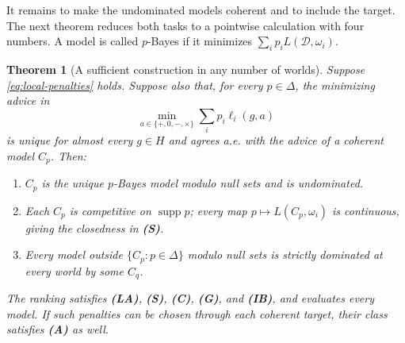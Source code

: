 \documentclass[11pt]{article}
\newtheorem{theorem}{Theorem}
\theoremstyle{remark}
\newcommand{\Dscr}{\mathcal D}
\newcommand{\supp}{\operatorname{supp}}
\begin{document}
It remains to make the undominated models coherent and to include the target.
The next theorem reduces both tasks to a pointwise calculation with four
numbers. A model is called $p$-Bayes if it minimizes
$\sum_i p_iL(\Dscr,\omega_i)$.

\begin{theorem}[A sufficient construction in any number of worlds]\label{thm:general}
Suppose \eqref{eq:local-penalties} holds. Suppose also that, for every
$p\in\Delta$, the minimizing advice in
\begin{equation}
 \min_{a\in\{+,0,-,\times\}}\sum_i p_i\ell_i(g,a)
 \label{eq:pointwise-bayes}
\end{equation}
is unique for almost every $g\in H$ and agrees a.e. with the advice of a
coherent model $C_p$. Then:
\begin{enumerate}[label=(\alph*)]
\item $C_p$ is the unique $p$-Bayes model modulo null sets and is undominated.
\item Each $C_p$ is competitive on $\supp p$; every map
$p\mapsto L(C_p,\omega_i)$ is continuous, giving the closedness in \textbf{(S)}.
\item Every model outside $\{C_p:p\in\Delta\}$ modulo null sets is strictly
dominated at every world by some $C_q$.
\end{enumerate}
The ranking satisfies \textbf{(LA)}, \textbf{(S)}, \textbf{(C)}, \textbf{(G)},
and \textbf{(IB)}, and evaluates every model. If such penalties can be chosen
through each coherent target, their class satisfies \textbf{(A)} as well.
\end{theorem}
\end{document}
